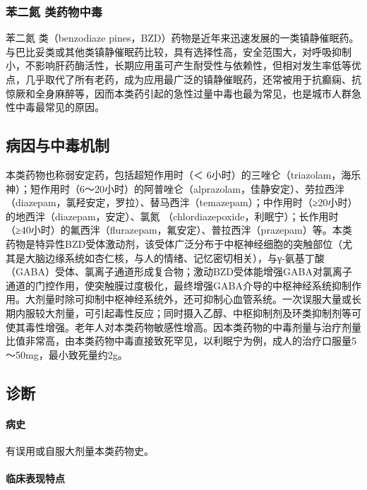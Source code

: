 \subsubsection{苯二氮{} 类药物中毒}

苯二氮{} 类（benzodiaze
pines，BZD）药物是近年来迅速发展的一类镇静催眠药。与巴比妥类或其他类镇静催眠药比较，具有选择性高，安全范围大，对呼吸抑制小，不影响肝药酶活性，长期应用虽可产生耐受性与依赖性，但相对发生率低等优点，几乎取代了所有老药，成为应用最广泛的镇静催眠药，还常被用于抗癫痫、抗惊厥和全身麻醉等，因而本类药引起的急性过量中毒也最为常见，也是城市人群急性中毒最常见的原因。

\subsection{病因与中毒机制}

本类药物也称弱安定药，包括超短作用时（＜
6小时）的三唑仑（triazolam，海乐神）；短作用时（6～20小时）的阿普唑仑（alprazolam，佳静安定）、劳拉西泮（diazepam，氯羟安定，罗拉）、替马西泮（temazepam）；中作用时（≥20小时）的地西泮（diazepam，安定）、氯氮{}
（chlordiazepoxide，利眠宁）；长作用时（≥40小时）的氟西泮（flurazepam，氟安定）、普拉西泮（prazepam）等。本类药物是特异性BZD受体激动剂，该受体广泛分布于中枢神经细胞的突触部位（尤其是大脑边缘系统如杏仁核，与人的情绪、记忆密切相关），与γ-氨基丁酸（GABA）受体、氯离子通道形成复合物；激动BZD受体能增强GABA对氯离子通道的门控作用，使突触膜过度极化，最终增强GABA介导的中枢神经系统抑制作用。大剂量时除可抑制中枢神经系统外，还可抑制心血管系统。一次误服大量或长期内服较大剂量，可引起毒性反应；同时摄入乙醇、中枢抑制剂及环类抑制剂等可使其毒性增强。老年人对本类药物敏感性增高。因本类药物的中毒剂量与治疗剂量比值非常高，由本类药物中毒直接致死罕见，以利眠宁为例，成人的治疗口服量5～50mg，最小致死量约2g。

\subsection{诊断}

\paragraph{病史}

有误用或自服大剂量本类药物史。

\paragraph{临床表现特点}

